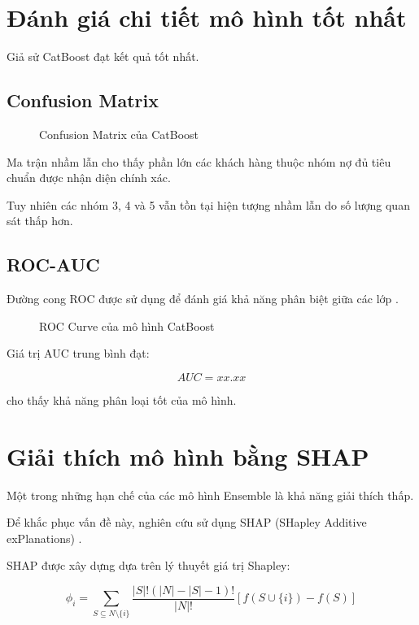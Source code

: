 \section{Đánh giá chi tiết mô hình tốt nhất}

Giả sử CatBoost đạt kết quả tốt nhất.

\subsection{Confusion Matrix}

\begin{figure}[H]
\centering
\caption{Confusion Matrix của CatBoost}
\label{fig:cm}
\end{figure}

Ma trận nhầm lẫn cho thấy phần lớn các khách hàng thuộc nhóm nợ đủ tiêu chuẩn được nhận diện chính xác.

Tuy nhiên các nhóm 3, 4 và 5 vẫn tồn tại hiện tượng nhầm lẫn do số lượng quan sát thấp hơn.

\subsection{ROC-AUC}

Đường cong ROC được sử dụng để đánh giá khả năng phân biệt giữa các lớp \cite{fawcett2006roc}.

\begin{figure}[H]
\centering
\caption{ROC Curve của mô hình CatBoost}
\end{figure}

Giá trị AUC trung bình đạt:

\[
AUC = xx.xx
\]

cho thấy khả năng phân loại tốt của mô hình.

\section{Giải thích mô hình bằng SHAP}

Một trong những hạn chế của các mô hình Ensemble là khả năng giải thích thấp.

Để khắc phục vấn đề này, nghiên cứu sử dụng SHAP (SHapley Additive exPlanations) \cite{lundberg2017unified}.

SHAP được xây dựng dựa trên lý thuyết giá trị Shapley:

\[
\phi_i
=
\sum_{S \subseteq N \setminus \{i\}}
\frac{|S|!(|N|-|S|-1)!}
{|N|!}
\left[
f(S \cup \{i\}) - f(S)
\right]
\]

